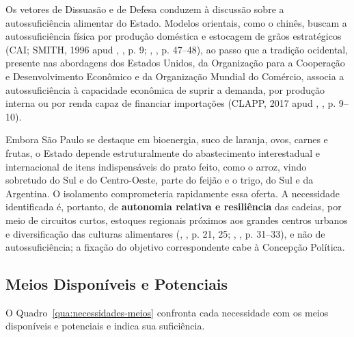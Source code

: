 \documentclass[
	12pt,				%
	openright,			%
	oneside,			%
	a4paper,			%
	chapter=TITLE,		%
	section=TITLE,		%
	english,			%
	french,				%
	spanish,			%
	brazil,				%
 ]{abntex2}
\begin{document}
Os vetores de Dissuasão e de Defesa conduzem à discussão sobre a
autossuficiência alimentar do Estado. Modelos orientais, como o chinês, buscam a
autossuficiência física por produção doméstica e estocagem de grãos
estratégicos (CAI; SMITH, 1996 apud \citeauthor{bertolini2022}, \citeyear{bertolini2022}, p. 9;
\citeauthor{perez2018}, \citeyear{perez2018}, p. 47--48), ao passo que a tradição ocidental, presente
nas abordagens dos Estados Unidos, da Organização para a Cooperação e
Desenvolvimento Econômico e da Organização Mundial do Comércio, associa a autossuficiência
à capacidade econômica de suprir a demanda, por produção interna ou por renda
capaz de financiar importações (CLAPP, 2017 apud
\citeauthor{bertolini2022}, \citeyear{bertolini2022}, p. 9--10).

Embora São Paulo se destaque em bioenergia, suco de laranja, ovos, carnes e
frutas, o Estado depende estruturalmente do abastecimento interestadual e
internacional de itens indispensáveis do prato feito, como o arroz, vindo
sobretudo do Sul e do Centro-Oeste, parte do feijão e o trigo, do Sul e da
Argentina. O isolamento comprometeria rapidamente essa oferta. A necessidade
identificada é, portanto, de \textbf{autonomia relativa e resiliência} das
cadeias, por meio de circuitos curtos, estoques regionais próximos aos grandes
centros urbanos e diversificação das culturas alimentares
(\citeauthor{bertolini2022}, \citeyear{bertolini2022}, p. 21, 25; \citeauthor{perez2018}, \citeyear{perez2018}, p. 31--33), e
não de autossuficiência; a fixação do objetivo correspondente cabe à Concepção
Política.

\subsection{Meios Disponíveis e Potenciais}
O Quadro~\ref{qua:necessidades-meios} confronta cada necessidade com os meios
disponíveis e potenciais e indica sua suficiência.
\end{document}

